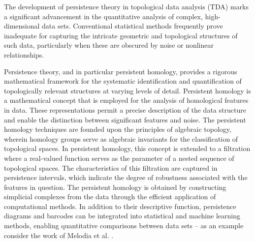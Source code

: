 The development of persistence theory in topological data analysis (TDA) marks a significant advancement in the quantitative analysis of complex, high-dimensional data sets. Conventional statistical methods frequently prove inadequate for capturing the intricate geometric and topological structures of such data, particularly when these are obscured by noise or nonlinear relationships.

Persistence theory, and in particular persistent homology, provides a rigorous mathematical framework for the systematic identification and quantification of topologically relevant structures at varying levels of detail. Persistent homology is a mathematical concept that is employed for the analysis of homological features in data. These representations permit a precise description of the data structure and enable the distinction between significant features and noise. The persistent homology techniques are founded upon the principles of algebraic topology, wherein homology groups serve as algebraic invariants for the classification of topological spaces. In persistent homology, this concept is extended to a filtration where a real-valued function serves as the parameter of a nested sequence of topological spaces. The characteristics of this filtration are captured in persistence intervals, which indicate the degree of robustness associated with the features in question. The persistent homology is obtained by constructing simplicial complexes from the data through the efficient application of computational methods. In addition to their descriptive function, persistence diagrams and barcodes can be integrated into statistical and machine learning methods, enabling quantitative comparisons between data sets -- as an example consider the work of Melodia et al. \cite{melodia2018deep,melodia2020persistent,melodia2021estimate,melodia2021homological}.

